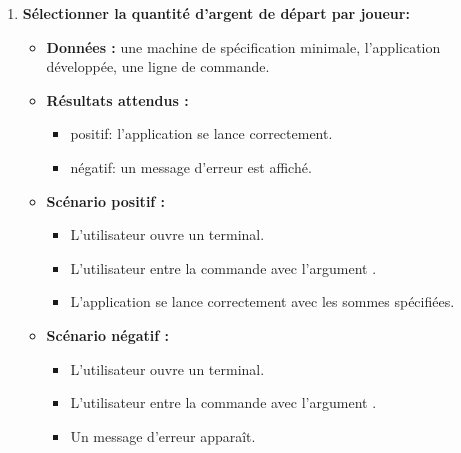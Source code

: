 \begin{enumerate}
    \item \textbf{Sélectionner la quantité d'argent de départ par joueur:}
    \begin{itemize}
        \item \textbf{Données :} une machine de spécification minimale, l'application développée, une ligne de commande.
        \item \textbf{Résultats attendus :} 
        \begin{itemize}
            \item positif: l'application se lance correctement. \item négatif: un message d'erreur est affiché.
        \end{itemize}
        \item \textbf{Scénario positif :}
        \begin{itemize}
            \item L’utilisateur ouvre un terminal.
            \item L’utilisateur entre la commande avec l'argument .
            \item L'application se lance correctement avec les sommes spécifiées.
        \end{itemize}
        \item \textbf{Scénario négatif :}
        \begin{itemize}
            \item L’utilisateur ouvre un terminal.
            \item L’utilisateur entre la commande avec l'argument .
            \item Un message d'erreur apparaît.
        \end{itemize}
    \end{itemize}


\end{enumerate}

